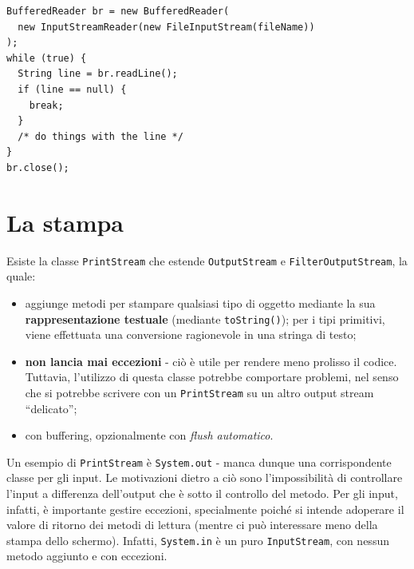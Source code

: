 \documentclass[\fontsizeclass,twocolumn]{\classname}
\theoremstyle{definition}
\theoremstyle{definition}
\begin{document}
\begin{lstlisting}
BufferedReader br = new BufferedReader(
  new InputStreamReader(new FileInputStream(fileName))
);
while (true) {
  String line = br.readLine();
  if (line == null) {
    break;
  }
  /* do things with the line */
}
br.close();
\end{lstlisting}

\chapter{La stampa}

Esiste la classe \texttt{PrintStream} che estende \texttt{Output\-Stream} e
\texttt{FilterOutputStream}, la quale:
\begin{itemize}
    \item aggiunge metodi per stampare qualsiasi tipo di oggetto mediante la
        sua \textbf{rappresentazione testuale} (mediante \texttt{toString()});
        per i tipi primitivi, viene effettuata una conversione ragionevole in
        una stringa di testo;
    \item \textbf{non lancia mai eccezioni} \-- ciò è utile per rendere meno
        prolisso il codice. Tuttavia, l'utilizzo di questa classe potrebbe
        comportare problemi, nel senso che si potrebbe scrivere con un
        \texttt{PrintStream} su un altro output stream ``delicato'';
    \item con buffering, opzionalmente con \emph{flush automatico}.
\end{itemize}

Un esempio di \texttt{PrintStream} è \texttt{System.out} \-- manca dunque una
corrispondente classe per gli input. Le motivazioni dietro a ciò sono
l'impossibilità di controllare l'input a differenza dell'output che è sotto il
controllo del metodo. Per gli input, infatti, è importante gestire eccezioni,
specialmente poiché si intende adoperare il valore di ritorno dei metodi di
lettura (mentre ci può interessare meno della stampa dello schermo).
Infatti, \texttt{System.in} è un puro \texttt{Input\-Stream}, con nessun metodo
aggiunto e con eccezioni.
\end{document}
